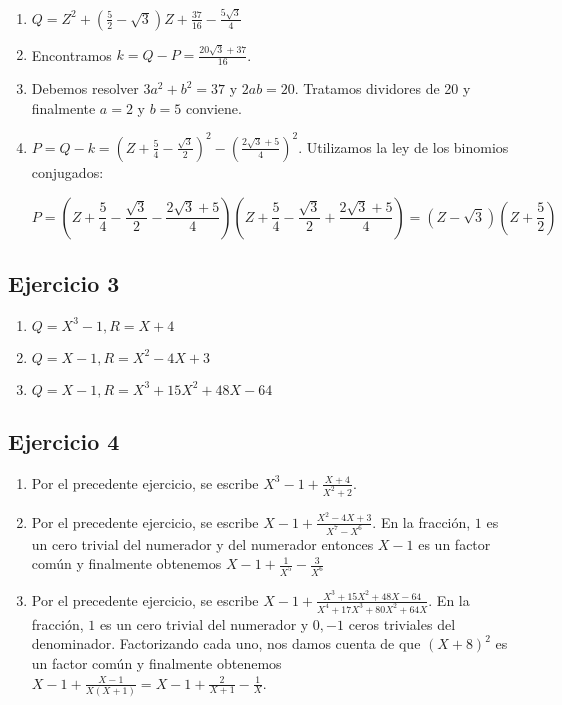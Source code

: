 \begin{enumerate}
\item $Q = Z^2 + \left(\frac{5}{2} - \sqrt{3}\right) Z + \frac{37}{16} - \frac{5 \sqrt{3}}{4}$
\item Encontramos $k = Q - P = \frac{20\sqrt{3} + 37}{16}$.
\item Debemos resolver $3a^2 + b^2 = 37$ y $2ab=20$. Tratamos dividores de 20
  y finalmente $a = 2$ y $b = 5$ conviene.
\item $P = Q - k = \left( Z + \frac{5}{4} - \frac{\sqrt{3}}{2} \right)^2 -
  \left(\frac{2 \sqrt{3} + 5}{4} \right)^2$. Utilizamos la ley de los
  binomios conjugados:

  $$P = \left( Z + \frac{5}{4} - \frac{\sqrt{3}}{2} 
  - \frac{2 \sqrt{3} + 5}{4}
  \right) \left( Z + \frac{5}{4} - \frac{\sqrt{3}}{2} 
  + \frac{2 \sqrt{3} + 5}{4}
  \right) =
  \left( Z - \sqrt{3} \right) \left( Z + \frac{5}{2} \right)$$
\end{enumerate}

\subsection*{Ejercicio 3}

\begin{enumerate}
\item $Q = X^3-1, R = X + 4$
\item $Q = X - 1, R = X^2 -4X + 3$
\item $Q = X - 1, R = X^3+15X^2+48X - 64$
\end{enumerate}

\subsection*{Ejercicio 4}

\begin{enumerate}
\item Por el precedente ejercicio, se escribe $X^3 - 1 + \frac{X+4}{X^2+2}$.
\item Por el precedente ejercicio, se escribe
  $X-1 + \frac{X^2-4X+3}{X^7-X^6}$. En la fracción,
  $1$ es un cero trivial del numerador y del numerador entonces $X-1$ es un
  factor común y finalmente obtenemos
  $X-1 + \frac{1}{X^5} - \frac{3}{X^6}$
\item Por el precedente ejercicio, se escribe
  $X - 1 + \frac{X^3+15X^2+48X-64}{X^4+17X^3+80X^2+64X}$. En la fracción, $1$ es
  un cero trivial del numerador y $0, -1$ ceros triviales del denominador.
  Factorizando cada uno, nos damos cuenta de que $(X+8)^2$ es un factor común
  y finalmente obtenemos $X - 1 + \frac{X-1}{X{(X+1)}} = 
  X - 1 + \frac{2}{X+1} - \frac{1}{X}$.
\end{enumerate}
